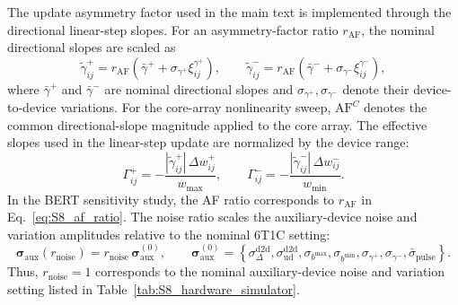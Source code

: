 \documentclass[AMA,LATO1COL]{WileyNJDv5}
\begin{document}
\noindent
The update asymmetry factor used in the main text is implemented through the directional linear-step slopes. For an asymmetry-factor ratio \(r_{\mathrm{AF}}\), the nominal directional slopes are scaled as
\begin{equation}
\widetilde{\gamma}^{+}_{ij}
=
r_{\mathrm{AF}}
\left(
\bar{\gamma}^{+}
+
\sigma_{\gamma^{+}}\xi_{ij}^{\gamma^{+}}
\right),
\qquad
\widetilde{\gamma}^{-}_{ij}
=
r_{\mathrm{AF}}
\left(
\bar{\gamma}^{-}
+
\sigma_{\gamma^{-}}\xi_{ij}^{\gamma^{-}}
\right),
\label{eq:S8_af_ratio}
\end{equation}
where \(\bar{\gamma}^{+}\) and \(\bar{\gamma}^{-}\) are nominal directional slopes and \(\sigma_{\gamma^{+}},\sigma_{\gamma^{-}}\) denote their device-to-device variations. For the core-array nonlinearity sweep, \(\mathrm{AF}^{C}\) denotes the common directional-slope magnitude applied to the core array. The effective slopes used in the linear-step update are normalized by the device range:
\begin{equation}
\Gamma^{+}_{ij}
=
-\frac{|\widetilde{\gamma}^{+}_{ij}|\,\Delta w^{+}_{ij}}{w_{\max}},
\qquad
\Gamma^{-}_{ij}
=
-\frac{|\widetilde{\gamma}^{-}_{ij}|\,\Delta w^{-}_{ij}}{w_{\min}} .
\label{eq:S8_effective_slope}
\end{equation}
In the BERT sensitivity study, the AF ratio corresponds to \(r_{\mathrm{AF}}\) in Eq.~\eqref{eq:S8_af_ratio}. The noise ratio scales the auxiliary-device noise and variation amplitudes relative to the nominal 6T1C setting:
\begin{equation}
\boldsymbol{\sigma}_{\mathrm{aux}}(r_{\mathrm{noise}})
=
r_{\mathrm{noise}}\,
\boldsymbol{\sigma}_{\mathrm{aux}}^{(0)},
\qquad
\boldsymbol{\sigma}_{\mathrm{aux}}^{(0)}
=
\left\{
\sigma_{\Delta}^{\mathrm{d2d}},
\sigma_{\mathrm{ud}}^{\mathrm{d2d}},
\sigma_{b^{\max}},
\sigma_{b^{\min}},
\sigma_{\gamma^{+}},
\sigma_{\gamma^{-}},
\bar{\sigma}_{\mathrm{pulse}}
\right\}.
\label{eq:S8_noise_ratio}
\end{equation}
Thus, \(r_{\mathrm{noise}}=1\) corresponds to the nominal auxiliary-device noise and variation setting listed in Table~\ref{tab:S8_hardware_simulator}.
\end{document}
